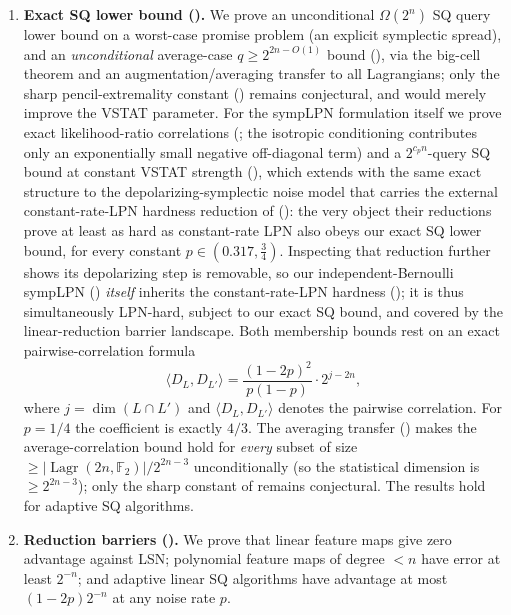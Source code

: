 \documentclass[11pt,a4paper]{article}
\theoremstyle{plain}
\theoremstyle{definition}
\newcommand{\F}{\mathbb{F}}
\DeclareMathOperator{\Lagr}{Lagr}
\begin{document}
\begin{enumerate}
    \item \textbf{Exact SQ lower bound ().} We prove an unconditional $\Omega(2^n)$ SQ query lower bound on a worst-case promise problem (an explicit symplectic spread), and an \emph{unconditional} average-case $q \geq 2^{2n - O(1)}$ bound (), via the big-cell theorem and an augmentation/averaging transfer to all Lagrangians; only the sharp pencil-extremality constant () remains conjectural, and would merely improve the VSTAT parameter. For the sympLPN formulation itself we prove exact likelihood-ratio correlations (; the isotropic conditioning contributes only an exponentially small negative off-diagonal term) and a $2^{c_p n}$-query SQ bound at constant VSTAT strength (), which extends with the same exact structure to the depolarizing-symplectic noise model that carries the external constant-rate-LPN hardness reduction of \cite{KLP+25,LPQR26} (): the very object their reductions prove at least as hard as constant-rate LPN also obeys our exact SQ lower bound, for every constant $p\in(0.317,\tfrac34)$. Inspecting that reduction further shows its depolarizing step is removable, so our independent-Bernoulli sympLPN () \emph{itself} inherits the constant-rate-LPN hardness (); it is thus simultaneously LPN-hard, subject to our exact SQ bound, and covered by the linear-reduction barrier landscape. Both membership bounds rest on an exact pairwise-correlation formula
    \[
    \langle D_L, D_{L'} \rangle = \frac{(1-2p)^2}{p(1-p)} \cdot 2^{j-2n},
    \]
    where $j = \dim(L \cap L')$ and $\langle D_L, D_{L'} \rangle$ denotes the pairwise correlation. For $p=1/4$ the coefficient is exactly $4/3$. The averaging transfer () makes the average-correlation bound hold for \emph{every} subset of size $\ge|\Lagr(2n,\F_2)|/2^{2n-3}$ unconditionally (so the statistical dimension is $\ge 2^{2n-3}$); only the sharp constant of  remains conjectural. The results hold for adaptive SQ algorithms.

    \item \textbf{Reduction barriers ().} We prove that linear feature maps give zero advantage against LSN; polynomial feature maps of degree $< n$ have error at least $2^{-n}$; and adaptive linear SQ algorithms have advantage at most $(1-2p)2^{-n}$ at any noise rate $p$.
    

\end{enumerate}
\end{document}
